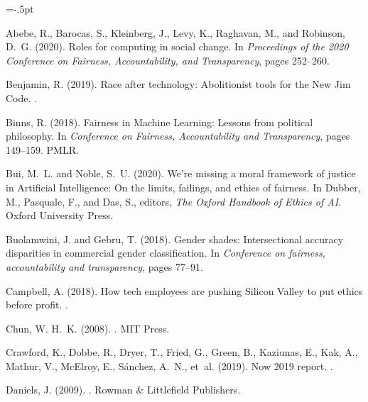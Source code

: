 \documentclass[11pt]{article}
\begin{document}
\begin{thebibliography}{10}
\itemsep=-.5pt
 
Abebe, R., Barocas, S., Kleinberg, J., Levy, K., Raghavan, M., and Robinson,
  D.~G. (2020).
\newblock Roles for computing in social change.
\newblock In {\em Proceedings of the 2020 Conference on Fairness,
  Accountability, and Transparency}, pages 252--260.

Benjamin, R. (2019).
\newblock Race after technology: Abolitionist tools for the {New Jim Code}.
.

Binns, R. (2018).
\newblock Fairness in {M}achine {L}earning: Lessons from political philosophy.
\newblock In {\em Conference on Fairness, Accountability and Transparency},
  pages 149--159. PMLR.

Bui, M.~L. and Noble, S.~U. (2020).
\newblock We're missing a moral framework of justice in {A}rtificial
  {I}ntelligence: On the limits, failings, and ethics of fairness.
\newblock In Dubber, M., Pasquale, F., and Das, S., editors, {\em The Oxford
  Handbook of Ethics of AI}. Oxford University Press.

Buolamwini, J. and Gebru, T. (2018).
\newblock Gender shades: Intersectional accuracy disparities in commercial
  gender classification.
\newblock In {\em Conference on fairness, accountability and transparency},
  pages 77--91.

Campbell, A. (2018).
\newblock How tech employees are pushing {S}ilicon {V}alley to put ethics
  before profit.
.

Chun, W. H.~K. (2008).
.
\newblock MIT Press.

Crawford, K., Dobbe, R., Dryer, T., Fried, G., Green, B., Kaziunas, E., Kak,
  A., Mathur, V., McElroy, E., S{\'a}nchez, A.~N., et~al. (2019).
 {N}ow 2019 report.
.

Daniels, J. (2009).
.
\newblock Rowman \& Littlefield Publishers.


\end{thebibliography}
\end{document}
